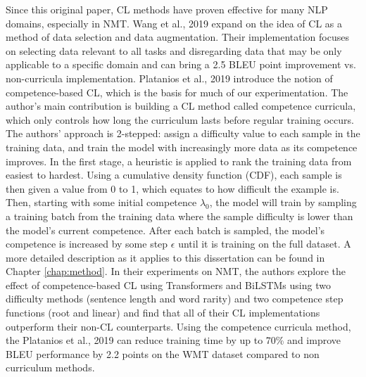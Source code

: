 Since this original paper, CL methods have proven effective for many NLP domains, especially in NMT. Wang et al., 2019 \cite{Wang2019LearningAM} expand on the idea of CL as a method of data selection and data augmentation. Their implementation focuses on selecting data relevant to all tasks and disregarding data that may be only applicable to a specific domain and can bring a 2.5 BLEU point improvement vs. non-curricula implementation. Platanios et al., 2019 \cite{Platanios2019CompetencebasedCL} introduce the notion of competence-based CL, which is the basis for much of our experimentation. The author's main contribution is building a CL method called competence curricula, which only controls how long the curriculum lasts before regular training occurs. The authors' approach is 2-stepped: assign a difficulty value to each sample in the training data, and train the model with increasingly more data as its competence improves. In the first stage, a heuristic is applied to rank the training data from easiest to hardest. Using a cumulative density function (CDF), each sample is then given a value from 0 to 1, which equates to how difficult the example is. Then, starting with some initial competence $\lambda_0$, the model will train by sampling a training batch from the training data where the sample difficulty is lower than the model's current competence. After each batch is sampled, the model's competence is increased by some step $\epsilon$ until it is training on the full dataset. A more detailed description as it applies to this dissertation can be found in Chapter \ref{chap:method}. In their experiments on NMT, the authors explore the effect of competence-based CL using Transformers and BiLSTMs using two difficulty methods (sentence length and word rarity) and two competence step functions (root and linear) and find that all of their CL implementations outperform their non-CL counterparts. Using the competence curricula method, the Platanios et al., 2019 can reduce training time by up to 70\% and improve BLEU performance by 2.2 points on the WMT dataset compared to non curriculum methods. 